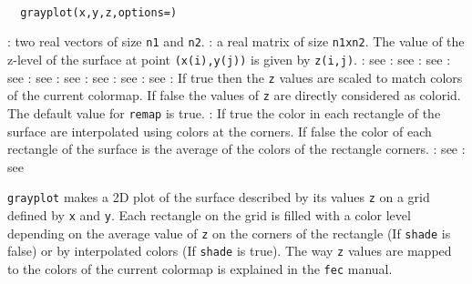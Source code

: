 
\begin{mandesc}
  \\ 
\end{mandesc}
\begin{calling_sequence}
\begin{verbatim}
  grayplot(x,y,z,options=)
\end{verbatim}
\end{calling_sequence}

\begin{parameters}
  \begin{varlist}
    : two real vectors of size \verb!n1! and \verb!n2!.
    : a real matrix of size \verb!n1xn2!. The value of the z-level of the 
    surface at point \verb!(x(i),y(j))! is given by \verb!z(i,j)!.
    : see 
    : see 
    : see 
    : see 
    : see 
    : see 
    : see 
    : see 
    : see 
    : If true then the \verb!z! values are scaled to match colors of the current colormap. 
    If false the values of \verb!z! are directly considered as colorid. The default value for \verb!remap! is true.
    : If true the color in each rectangle of the surface are interpolated using colors at the 
    corners. If false the color of each rectangle of the surface is the average of the colors of the rectangle corners.
    :  see 
    : see 
    \end{varlist}
\end{parameters}

\begin{mandescription}
  \verb!grayplot! makes a 2D plot of the surface described by its values \verb!z! on a grid defined by \verb!x! and \verb!y!.
  Each rectangle on the grid is filled with a color level depending on the average value of \verb!z! on the corners of the
  rectangle (If \verb!shade! is false) or by interpolated colors (If \verb!shade! is true). The way \verb!z! values 
  are mapped to the colors of the current colormap is explained in the \verb!fec! manual.
\end{mandescription}

